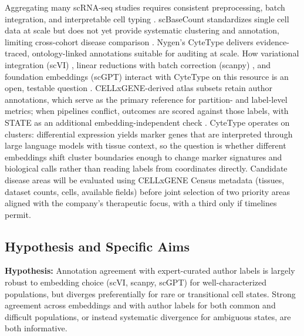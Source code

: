 \documentclass[12pt,a4paper]{article}
\begin{document}
Aggregating many scRNA-seq studies requires consistent preprocessing, batch integration, and interpretable cell typing \cite{wolfSCANPYLargescaleSinglecell2018}. scBaseCount standardizes single cell data at scale but does not yet provide systematic clustering and annotation, limiting cross-cohort disease comparison \cite{youngblutScBaseCountAIAgentcurated2025}. Nygen's CyteType delivers evidence-traced, ontology-linked annotations suitable for auditing at scale. How variational integration (scVI) \cite{lopezDeepGenerativeModeling2018}, linear reductions with batch correction (scanpy) \cite{wolfSCANPYLargescaleSinglecell2018}, and foundation embeddings (scGPT) \cite{cuiScGPTBuildingFoundation2024} interact with CyteType on this resource is an open, testable question \cite{ahujaMultiagentAIEnables2025}. CELLxGENE-derived atlas subsets retain author annotations, which serve as the primary reference for partition- and label-level metrics; when pipelines conflict, outcomes are scored against those labels, with STATE as an additional embedding-independent check \cite{czicellscienceprogramCZCELLxGENEDiscover2025}. CyteType operates on clusters: differential expression yields marker genes that are interpreted through large language models with tissue context, so the question is whether different embeddings shift cluster boundaries enough to change marker signatures and biological calls rather than reading labels from coordinates directly. Candidate disease areas will be evaluated using CELLxGENE Census metadata (tissues, dataset counts, cells, available fields) before joint selection of two priority areas aligned with the company's therapeutic focus, with a third only if timelines permit.

\subsection*{Hypothesis and Specific Aims}

\textbf{Hypothesis:} Annotation agreement with expert-curated author labels is largely robust to embedding choice (scVI, scanpy, scGPT) for well-characterized populations, but diverges preferentially for rare or transitional cell states. Strong agreement across embeddings and with author labels for both common and difficult populations, or instead systematic divergence for ambiguous states, are both informative.
\end{document}
